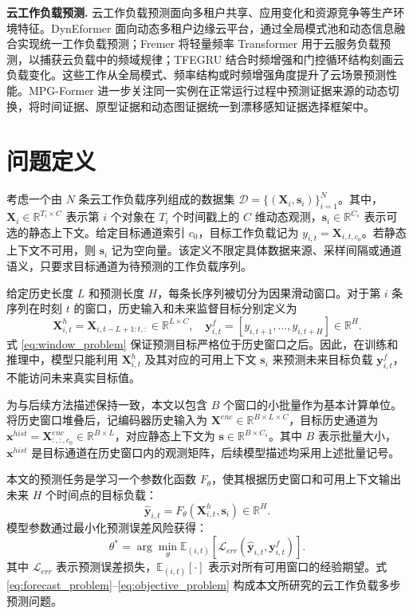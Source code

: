 \documentclass[UTF8]{ctexart}
\begin{document}
\noindent\textbf{云工作负载预测.}
云工作负载预测面向多租户共享、应用变化和资源竞争等生产环境特征。DynEformer 面向动态多租户边缘云平台，通过全局模式池和动态信息融合实现统一工作负载预测\cite{wang2023dyn}；Fremer 将轻量频率 Transformer 用于云服务负载预测，以捕获云负载中的频域规律\cite{zhou2024fremer}；TFEGRU 结合时频增强和门控循环结构刻画云负载变化\cite{tfegru2024}。这些工作从全局模式、频率结构或时频增强角度提升了云场景预测性能。MPG-Former 进一步关注同一实例在正常运行过程中预测证据来源的动态切换，将时间证据、原型证据和动态图证据统一到漂移感知证据选择框架中。

\section{问题定义}

考虑一个由 $N$ 条云工作负载序列组成的数据集 $\mathcal D=\{(\mathbf X_i,\mathbf s_i)\}_{i=1}^{N}$。其中，$\mathbf X_i\in\mathbb R^{T_i\times C}$ 表示第 $i$ 个对象在 $T_i$ 个时间戳上的 $C$ 维动态观测，$\mathbf s_i\in\mathbb R^{C_s}$ 表示可选的静态上下文。给定目标通道索引 $c_0$，目标工作负载记为 $y_{i,t}=\mathbf X_{i,t,c_0}$。若静态上下文不可用，则 $\mathbf s_i$ 记为空向量。该定义不限定具体数据来源、采样间隔或通道语义，只要求目标通道为待预测的工作负载序列。

给定历史长度 $L$ 和预测长度 $H$，每条长序列被切分为因果滑动窗口。对于第 $i$ 条序列在时刻 $t$ 的窗口，历史输入和未来监督目标分别定义为
\begin{equation}
    \mathbf X^{h}_{i,t}=\mathbf X_{i,t-L+1:t,:}\in\mathbb R^{L\times C},\quad
    \mathbf y^{f}_{i,t}=[y_{i,t+1},\ldots,y_{i,t+H}]\in\mathbb R^{H}.
    \label{eq:window_problem}
\end{equation}
式 \eqref{eq:window_problem} 保证预测目标严格位于历史窗口之后。因此，在训练和推理中，模型只能利用 $\mathbf X^{h}_{i,t}$ 及其对应的可用上下文 $\mathbf s_i$ 来预测未来目标负载 $\mathbf y^{f}_{i,t}$，不能访问未来真实目标值。

为与后续方法描述保持一致，本文以包含 $B$ 个窗口的小批量作为基本计算单位。将历史窗口堆叠后，记编码器历史输入为 $\mathbf X^{enc}\in\mathbb R^{B\times L\times C}$，目标历史通道为 $\mathbf x^{hist}=\mathbf X^{enc}_{:,:,c_0}\in\mathbb R^{B\times L}$，对应静态上下文为 $\mathbf s\in\mathbb R^{B\times C_s}$。其中 $B$ 表示批量大小，$\mathbf x^{hist}$ 是目标通道在历史窗口内的观测矩阵，后续模型描述均采用上述批量记号。

本文的预测任务是学习一个参数化函数 $F_{\theta}$，使其根据历史窗口和可用上下文输出未来 $H$ 个时间点的目标负载：
\begin{equation}
    \hat{\mathbf y}_{i,t}=F_{\theta}(\mathbf X^{h}_{i,t},\mathbf s_i)\in\mathbb R^H.
    \label{eq:forecast_problem}
\end{equation}
模型参数通过最小化预测误差风险获得：
\begin{equation}
    \theta^{*}=\arg\min_{\theta}\mathbb E_{(i,t)}\left[\mathcal L_{err}(\hat{\mathbf y}_{i,t},\mathbf y^{f}_{i,t})\right].
    \label{eq:objective_problem}
\end{equation}
其中 $\mathcal L_{err}$ 表示预测误差损失，$\mathbb E_{(i,t)}[\cdot]$ 表示对所有可用窗口的经验期望。式 \eqref{eq:forecast_problem}--\eqref{eq:objective_problem} 构成本文所研究的云工作负载多步预测问题。
\end{document}

